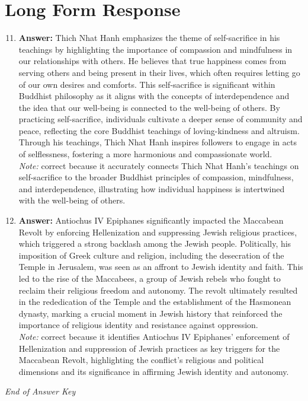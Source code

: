 \documentclass[12pt]{article}
\begin{document}
\section*{Long Form Response}
\begin{enumerate}[label=\arabic*.]
\setcounter{enumi}{10}
\item \textbf{Answer:} Thich Nhat Hanh emphasizes the theme of self-sacrifice in his teachings by highlighting the importance of compassion and mindfulness in our relationships with others. He believes that true happiness comes from serving others and being present in their lives, which often requires letting go of our own desires and comforts. This self-sacrifice is significant within Buddhist philosophy as it aligns with the concepts of interdependence and the idea that our well-being is connected to the well-being of others. By practicing self-sacrifice, individuals cultivate a deeper sense of community and peace, reflecting the core Buddhist teachings of loving-kindness and altruism. Through his teachings, Thich Nhat Hanh inspires followers to engage in acts of selflessness, fostering a more harmonious and compassionate world.
\\ \textit{Note:} correct because it accurately connects Thich Nhat Hanh's teachings on self-sacrifice to the broader Buddhist principles of compassion, mindfulness, and interdependence, illustrating how individual happiness is intertwined with the well-being of others.
\item \textbf{Answer:} Antiochus IV Epiphanes significantly impacted the Maccabean Revolt by enforcing Hellenization and suppressing Jewish religious practices, which triggered a strong backlash among the Jewish people. Politically, his imposition of Greek culture and religion, including the desecration of the Temple in Jerusalem, was seen as an affront to Jewish identity and faith. This led to the rise of the Maccabees, a group of Jewish rebels who fought to reclaim their religious freedom and autonomy. The revolt ultimately resulted in the rededication of the Temple and the establishment of the Hasmonean dynasty, marking a crucial moment in Jewish history that reinforced the importance of religious identity and resistance against oppression.
\\ \textit{Note:} correct because it identifies Antiochus IV Epiphanes' enforcement of Hellenization and suppression of Jewish practices as key triggers for the Maccabean Revolt, highlighting the conflict's religious and political dimensions and its significance in affirming Jewish identity and autonomy.
\end{enumerate}

\vfill
\noindent\textit{End of Answer Key}
\end{document}
